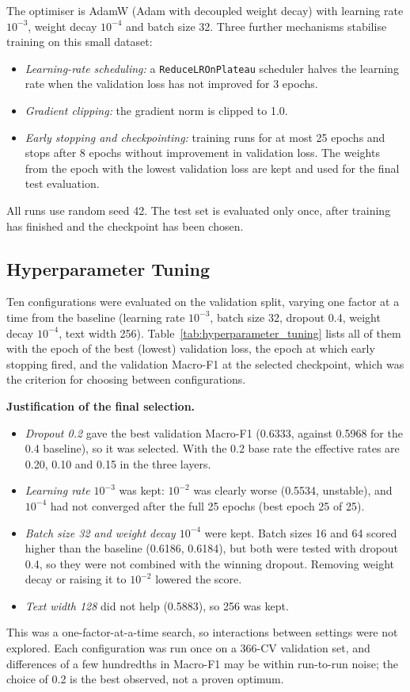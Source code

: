 \documentclass[11pt,a4paper]{article}
\begin{document}
The optimiser is AdamW (Adam with decoupled weight decay) with learning rate
$10^{-3}$, weight decay $10^{-4}$ and batch size 32. Three further mechanisms
stabilise training on this small dataset:
\begin{itemize}
  \item \emph{Learning-rate scheduling:} a \texttt{ReduceLROnPlateau}
  scheduler halves the learning rate when the validation loss has not
  improved for 3 epochs.
  \item \emph{Gradient clipping:} the gradient norm is clipped to 1.0.
  \item \emph{Early stopping and checkpointing:} training runs for at most 25
  epochs and stops after 8 epochs without improvement in validation loss. The
  weights from the epoch with the lowest validation loss are kept and used for
  the final test evaluation.
\end{itemize}
All runs use random seed 42. The test set is evaluated only once, after
training has finished and the checkpoint has been chosen.

\subsection{Hyperparameter Tuning}
Ten configurations were evaluated on the validation split, varying one factor
at a time from the baseline (learning rate $10^{-3}$, batch size 32, dropout
0.4, weight decay $10^{-4}$, text width 256). Table~\ref{tab:hyperparameter_tuning}
lists all of them with the epoch of the best (lowest) validation loss, the
epoch at which early stopping fired, and the validation Macro-F1 at the
selected checkpoint, which was the criterion for choosing between
configurations.

\begingroup
\centering\scriptsize\setlength{\tabcolsep}{3pt}

\endgroup

\textbf{Justification of the final selection.}
\begin{itemize}
  \item \emph{Dropout 0.2} gave the best validation Macro-F1 (0.6333,
  against 0.5968 for the 0.4 baseline), so it was selected. With the 0.2 base
  rate the effective rates are 0.20, 0.10 and 0.15 in the three layers.
  \item \emph{Learning rate $10^{-3}$} was kept: $10^{-2}$ was clearly worse
  (0.5534, unstable), and $10^{-4}$ had not converged after the full 25 epochs
  (best epoch 25 of 25).
  \item \emph{Batch size 32 and weight decay $10^{-4}$} were kept. Batch sizes
  16 and 64 scored higher than the baseline (0.6186, 0.6184), but both were
  tested with dropout 0.4, so they were not combined with the winning dropout.
  Removing weight decay or raising it to $10^{-2}$ lowered the score.
  \item \emph{Text width 128} did not help (0.5883), so 256 was kept.
\end{itemize}
This was a one-factor-at-a-time search, so interactions between settings were
not explored. Each configuration was run once on a 366-CV validation set, and
differences of a few hundredths in Macro-F1 may be within run-to-run noise;
the choice of 0.2 is the best observed, not a proven optimum.
\end{document}
